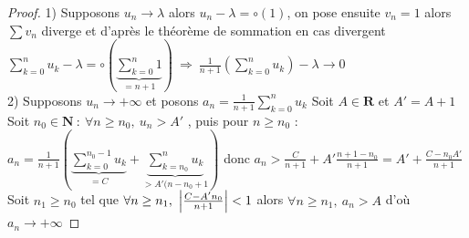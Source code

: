 		 \medskip
			
			
		\begin{proof}
			{\small 1)} Supposons $u_n \to \lambda$ alors $u_n - \lambda = \circ (1)$, on pose ensuite $v_n = 1$ alors $\sum v_n$ diverge 
			et d'après le théorème de sommation en cas divergent \\ $\sum_{k=0}^{n} u_k - \lambda = \circ ( \underbrace{\sum_{k=0}^{n} 1}_{=n+1} ) ~
			\Rightarrow ~\frac{1}{n+1} ( \sum_{k=0}^{n} u_k ) - \lambda \to 0$ \\
			{\small 2)} Supposons $u_n \to +\infty$ et posons $a_n = \frac{1}{n+1} \sum_{k=0}^{n} u_k$
			Soit $A\in\mathbf{R}$ et $A'=A+1$ \\ Soit $n_0 \in\mathbf{N} ~:~\forall n\geq n_0 ,~u_n >A'$ , puis pour $n\geq n_0$ :\\
			$a_n = \frac{1}{n+1} ( \underbrace{\sum_{k=0}^{n_0-1} u_k}_{=C} + \underbrace{\sum_{k=n_0}^{n} u_k}_{>A'(n-n_0+1} )$ 
			donc $a_n > \frac{C}{n+1} + A'\frac{n+1-n_0}{n+1} = A' + \frac{C-n_0A'}{n+1}$ \\ 
			Soit $n_1\geq n_0$ tel que $\forall n\geq n_1 ,~\left\vert \frac{C-A'n_0}{n+1} \right\vert <1$ alors $\forall n\geq n_1 ,~a_n > A$ d'où $a_n \to +\infty$
		\end{proof} \medskip
		

